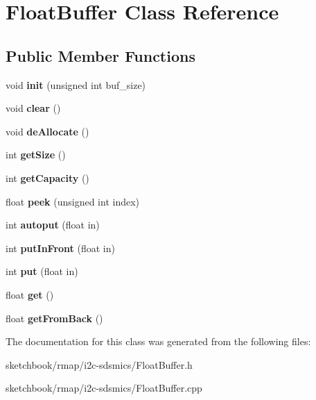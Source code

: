 \hypertarget{classFloatBuffer}{}\section{Float\+Buffer Class Reference}
\label{classFloatBuffer}
\subsection*{Public Member Functions}
\begin{DoxyCompactItemize}
\item 
\mbox{\label{classFloatBuffer_a8140ccad588d2770038a6d1b32ab8ed2}} 
void {\bfseries init} (unsigned int buf\+\_\+size)
\item 
\mbox{\label{classFloatBuffer_a1e5229a61effa7c06ac9e73318f05bf2}} 
void {\bfseries clear} ()
\item 
\mbox{\label{classFloatBuffer_a42d58cd3802cc0dcff30c6c15d9477e5}} 
void {\bfseries de\+Allocate} ()
\item 
\mbox{\label{classFloatBuffer_a6a5f421a6f21357fb0f14dcd69d33e11}} 
int {\bfseries get\+Size} ()
\item 
\mbox{\label{classFloatBuffer_a8d9c29200618b79fa89e935030bf8477}} 
int {\bfseries get\+Capacity} ()
\item 
\mbox{\label{classFloatBuffer_a45aec6e9eb976fc81988c0ddeb7b6235}} 
float {\bfseries peek} (unsigned int index)
\item 
\mbox{\label{classFloatBuffer_a194238e40c19a817d59418c302e0bcc2}} 
int {\bfseries autoput} (float in)
\item 
\mbox{\label{classFloatBuffer_a56cb0bc320552d1f820eff709174c5ce}} 
int {\bfseries put\+In\+Front} (float in)
\item 
\mbox{\label{classFloatBuffer_a6d8965925be535e0dfff826801e8ebf4}} 
int {\bfseries put} (float in)
\item 
\mbox{\label{classFloatBuffer_a3d3ea83d4e0dfd365ab451ae308b83b6}} 
float {\bfseries get} ()
\item 
\mbox{\label{classFloatBuffer_a601e8dfd416943319c839f9523ed29bd}} 
float {\bfseries get\+From\+Back} ()
\end{DoxyCompactItemize}


The documentation for this class was generated from the following files\+:\begin{DoxyCompactItemize}
\item 
sketchbook/rmap/i2c-\/sdsmics/Float\+Buffer.\+h\item 
sketchbook/rmap/i2c-\/sdsmics/Float\+Buffer.\+cpp\end{DoxyCompactItemize}
